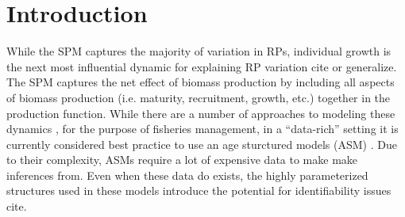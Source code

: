 %
\newcommand{\kr}{ \frac{\kappa w_\infty}{w(a_s)} }
\newcommand{\one}{
        \left(\frac{Z(Z+\kappa)}{\alpha w(a_s)(Z+\kr)}\right)^\gamma
}
\newcommand{\two}{
        \left(\frac{\gamma F}{\alpha w(a_s)}\right) \left(\frac{Z(Z+\kappa)}{\alpha w(a_s)(Z+\kr)}\right)^{\gamma-1}
}
\newcommand{\thr}{
        \frac{\left(\kr\right)\left(\kappa-\kr\right)}{(Z+\kr)^2}
}
%
\newcommand{\oneA}{
        \left(\frac{Z^*(Z^*+\kappa)}{w(a_s)(Z^*+\kr)}\right)^\gamma
}
\newcommand{\twoA}{
        \left(\frac{\gamma F^*}{w(a_s)}\right) \left(\frac{Z^*(Z^*+\kappa)}{w(a_s)(Z^*+\kr)}\right)^{\gamma-1}
}
\newcommand{\thrA}{
        \frac{\left(\kr\right)\left(\kappa-\kr\right)}{(Z^*+\kr)^2}
}



%
\section{Introduction}

%
While the SPM captures the majority of variation in RPs, individual growth is 
the next most influential dynamic for explaining RP variation {\color{red}cite 
or generalize}. The SPM captures the net effect of biomass production by 
including all aspects of biomass production (i.e. maturity, recruitment, 
growth, etc.) together in the production function. While there are a number of %
approaches to modeling these dynamics \cite{quinn_quantitative_1999, hilborn_quantitative_1992}, 
for the purpose of fisheries management, in a ``data-rich'' setting it is currently considered best 
practice to use an age sturctured models (ASM) \cite{methot_stock_2013}. Due to their complexity, 
ASMs require a lot of expensive data to make make inferences from. Even when these data do exists, 
the highly parameterized structures used in these models introduce the potential for identifiability 
issues {\color{red} cite}.

